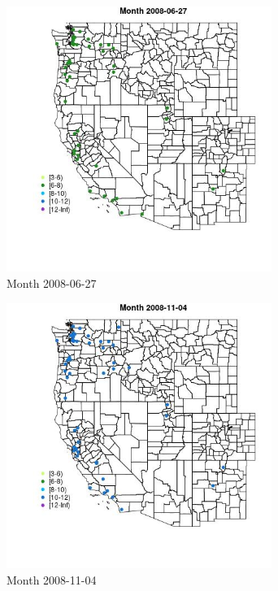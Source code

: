 \begin{figure} 
\centering  
\includegraphics[width=0.77\textwidth]{Code_Outputs/Report_ML_input_PM25_Step4_part_e_de_duplicated_aves_MapObsMonth2008-06-27.jpg} 
\caption{\label{fig:Report_ML_input_PM25_Step4_part_e_de_duplicated_avesMapObsMonth2008-06-27}Month 2008-06-27} 
\end{figure} 
 

\begin{figure} 
\centering  
\includegraphics[width=0.77\textwidth]{Code_Outputs/Report_ML_input_PM25_Step4_part_e_de_duplicated_aves_MapObsMonth2008-11-04.jpg} 
\caption{\label{fig:Report_ML_input_PM25_Step4_part_e_de_duplicated_avesMapObsMonth2008-11-04}Month 2008-11-04} 
\end{figure} 
 

